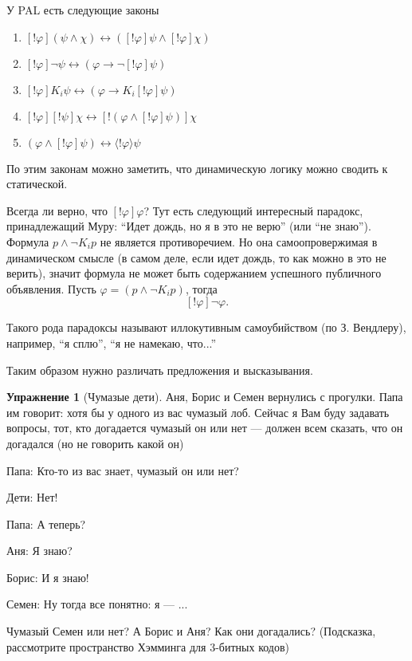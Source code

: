 \documentclass[openany]{book}
\theoremstyle{plain}
\theoremstyle{definition}
\newtheorem{xrc}{Упражнение}[]
\begin{document}

У PAL есть следующие законы
\begin{enumerate}
    \item \( [!\varphi] (\psi \land \chi) \leftrightarrow ([!\varphi] \psi \land [!\varphi] \chi) \)
    \item \( [!\varphi] \neg \psi \leftrightarrow (\varphi \to \neg [!\varphi] \psi) \)
    \item \( [!\varphi] K_i \psi \leftrightarrow (\varphi \to K_i [!\varphi] \psi) \)
    \item \( [!\varphi][!\psi] \chi \leftrightarrow [!(\varphi \land [!\varphi] \psi)]\chi \)
    \item \( (\varphi \land [!\varphi] \psi) \leftrightarrow \langle !\varphi \rangle \psi \)
\end{enumerate}

По этим законам можно заметить, что динамическую логику можно сводить к статической.

Всегда ли верно, что \([!\varphi]\varphi\)? Тут есть следующий интересный парадокс, принадлежащий Муру: ``Идет дождь, но я в это не верю'' (или ``не знаю''). Формула \(p \land \neg K_i p\) не является противоречием. Но она самоопровержимая в динамическом смысле (в самом деле, если идет дождь, то как можно в это не верить), значит формула не может быть содержанием успешного публичного объявления. Пусть \(\varphi = (p \land \neg K_i p)\), тогда \[[!\varphi] \neg \varphi.\]

Такого рода парадоксы называют иллокутивным самоубийством (по З. Вендлеру), например, ``я сплю'', ``я не намекаю, что...''

Таким образом нужно различать предложения и высказывания.

\begin{xrc}[Чумазые дети]
    Аня, Борис и Семен вернулись с прогулки. Папа им говорит: хотя бы у одного из вас чумазый лоб. Сейчас я Вам буду задавать вопросы, тот, кто догадается чумазый он или нет --- должен всем сказать, что он догадался (но не говорить какой он)

    Папа: Кто-то из вас знает, чумазый он или нет?

    Дети: Нет!

    Папа: А теперь?

    Аня: Я знаю?

    Борис: И я знаю!

    Семен: Ну тогда все понятно: я --- ...

    Чумазый Семен или нет? А Борис и Аня? Как они догадались?
    (Подсказка, рассмотрите пространство Хэмминга для \(3\)-битных кодов)
\end{xrc}
\end{document}
